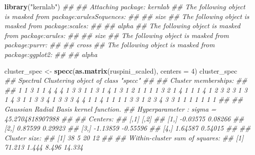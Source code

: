 \documentclass[
  notitlepage]{book}
\newenvironment{Shaded}{\begin{snugshade}}{\end{snugshade}}
\newcommand{\CommentTok}[1]{\textcolor[rgb]{0.56,0.35,0.01}{\textit{#1}}}
\newcommand{\DataTypeTok}[1]{\textcolor[rgb]{0.13,0.29,0.53}{#1}}
\newcommand{\DecValTok}[1]{\textcolor[rgb]{0.00,0.00,0.81}{#1}}
\newcommand{\KeywordTok}[1]{\textcolor[rgb]{0.13,0.29,0.53}{\textbf{#1}}}
\newcommand{\NormalTok}[1]{#1}
\newcommand{\StringTok}[1]{\textcolor[rgb]{0.31,0.60,0.02}{#1}}
\begin{document}
\begin{Shaded}
\begin{Highlighting}[]
\KeywordTok{library}\NormalTok{(}\StringTok{"kernlab"}\NormalTok{)}
\CommentTok{\#\# }
\CommentTok{\#\# Attaching package: \textquotesingle{}kernlab\textquotesingle{}}
\CommentTok{\#\# The following object is masked from \textquotesingle{}package:arulesSequences\textquotesingle{}:}
\CommentTok{\#\# }
\CommentTok{\#\#     size}
\CommentTok{\#\# The following object is masked from \textquotesingle{}package:scales\textquotesingle{}:}
\CommentTok{\#\# }
\CommentTok{\#\#     alpha}
\CommentTok{\#\# The following object is masked from \textquotesingle{}package:arules\textquotesingle{}:}
\CommentTok{\#\# }
\CommentTok{\#\#     size}
\CommentTok{\#\# The following object is masked from \textquotesingle{}package:purrr\textquotesingle{}:}
\CommentTok{\#\# }
\CommentTok{\#\#     cross}
\CommentTok{\#\# The following object is masked from \textquotesingle{}package:ggplot2\textquotesingle{}:}
\CommentTok{\#\# }
\CommentTok{\#\#     alpha}
\end{Highlighting}
\end{Shaded}

\begin{Shaded}
\begin{Highlighting}[]
\NormalTok{cluster\_spec \textless{}{-}}\StringTok{ }\KeywordTok{specc}\NormalTok{(}\KeywordTok{as.matrix}\NormalTok{(ruspini\_scaled), }\DataTypeTok{centers =} \DecValTok{4}\NormalTok{)}
\NormalTok{cluster\_spec}
\CommentTok{\#\# Spectral Clustering object of class "specc" }
\CommentTok{\#\# }
\CommentTok{\#\#  Cluster memberships: }
\CommentTok{\#\#  }
\CommentTok{\#\# 1 1 3 1 1 4 4 4 1 3 3 1 1 3 1 4 1 3 1 2 1 1 1 1 3 2 1 4 1 1 1 4 1 2 3 2 3 1 3 1 4 3 1 1 3 3 4 1 3 3 3 4 4 1 1 4 1 1 1 1 3 3 1 2 3 4 3 3 1 1 1 1 1 1 1 }
\CommentTok{\#\#  }
\CommentTok{\#\# Gaussian Radial Basis kernel function. }
\CommentTok{\#\#  Hyperparameter : sigma =  45.2704818907988 }
\CommentTok{\#\# }
\CommentTok{\#\# Centers:  }
\CommentTok{\#\#          [,1]     [,2]}
\CommentTok{\#\# [1,] {-}0.03575  0.08266}
\CommentTok{\#\# [2,]  0.87599  0.29923}
\CommentTok{\#\# [3,] {-}1.13859 {-}0.55596}
\CommentTok{\#\# [4,]  1.64587  0.54015}
\CommentTok{\#\# }
\CommentTok{\#\# Cluster size:  }
\CommentTok{\#\# [1] 38  5 20 12}
\CommentTok{\#\# }
\CommentTok{\#\# Within{-}cluster sum of squares:  }
\CommentTok{\#\# [1] 71.213  1.444  8.496 14.334}
\end{Highlighting}
\end{Shaded}
\end{document}
